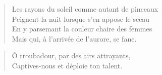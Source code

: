 %

\begin{verse}
Les rayons du soleil comme autant de pinceaux\\
Peignent  la nuit lorsque s’en appose le sceau\\
En y parsemant la couleur chaire des femmes\\
Mais qui, à l’arrivée de l’aurore, se fane.
\end{verse}

\begin{verse}
Ô troubadour, par des airs attrayants,\\
Captives-nous et déploie ton talent.
\end{verse}

